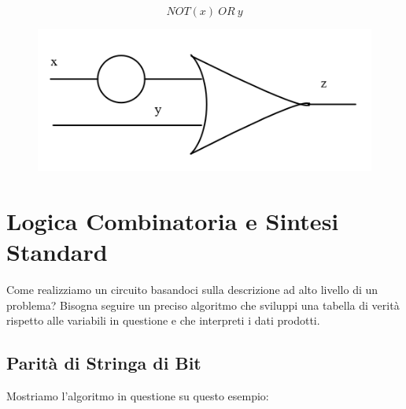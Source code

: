 \documentclass{article}
\begin{document}
\begin{equation}
    NOT (x) \: OR \: y
\end{equation}

    \begin{figure}[htbp]
        \center
        \includegraphics[scale=0.45]{img/exp2.png}
    \end{figure}    

\newpage

\section{Logica Combinatoria e Sintesi Standard}

Come realizziamo un circuito basandoci sulla descrizione ad alto livello di un problema?
Bisogna seguire un preciso algoritmo che sviluppi una tabella di verità rispetto alle variabili in questione e che interpreti i dati prodotti.

\subsection{Parità di Stringa di Bit} Mostriamo l'algoritmo in questione su questo esempio:
\end{document}
